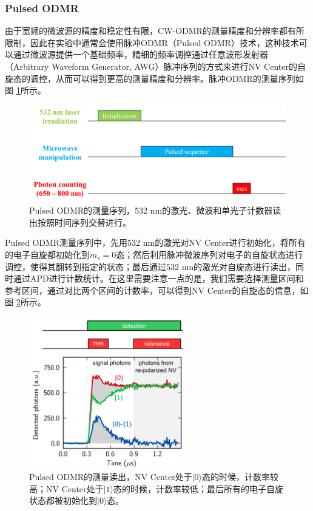 \documentclass[type = bachelor]{whu-thesis}
\begin{document}
\subsubsection{Pulsed ODMR}

由于宽频的微波源的精度和稳定性有限，CW-ODMR的测量精度和分辨率都有所限制，因此在实验中通常会使用脉冲ODMR（Pulsed ODMR）技术，这种技术可以通过微波源提供一个基础频率，精细的频率调控通过任意波形发射器（Arbitrary Waveform Generator, AWG）脉冲序列的方式来进行NV Center的自旋态的调控，从而可以得到更高的测量精度和分辨率。脉冲ODMR的测量序列如图 \ref{fig: Pulsed ODMR_seq}所示。

\begin{figure}
  \centering
  \includegraphics[width=1.0\textwidth]{figures/Chapter 1/Pulsed ODMR_seq.png}
  \caption[Pulsed ODMR的测量序列]{Pulsed ODMR的测量序列，532 nm的激光、微波和单光子计数器读出按照时间序列交替进行。}
  \label{fig: Pulsed ODMR_seq}
\end{figure}

Pulsed ODMR测量序列中，先用532 nm的激光对NV Center进行初始化，将所有的电子自旋都初始化到$m_s=0$态；然后利用脉冲微波序列对电子的自旋状态进行调控，使得其翻转到指定的状态；最后通过532 nm的激光对自旋态进行读出，同时通过APD进行计数统计。在这里需要注意一点的是，我们需要选择测量区间和参考区间，通过对比两个区间的计数率，可以得到NV Center的自旋态的信息，如图 \ref{fig: mes_ref}所示。

\begin{figure}
  \centering
  \includegraphics[width=0.6\textwidth]{figures/Chapter 1/mes_ref.png}
  \caption[Pulsed ODMR的测量读出]{Pulsed ODMR的测量读出，NV Center处于$|0\rangle$态的时候，计数率较高；NV Center处于$|1\rangle$态的时候，计数率较低；最后所有的电子自旋状态都被初始化到$|0\rangle$态\cite{staudacher2015nuclear}。}
  \label{fig: mes_ref}
\end{figure}
\end{document}
